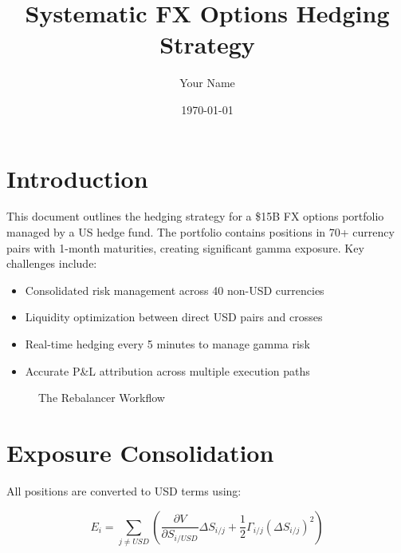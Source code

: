 \documentclass{article}
\title{Systematic FX Options Hedging Strategy}
\author{Your Name}
\date{\today}
\begin{document}
\maketitle

\section{Introduction}
This document outlines the hedging strategy for a \$15B FX options portfolio managed by a US hedge fund. The portfolio contains positions in 70+ currency pairs with 1-month maturities, creating significant gamma exposure. Key challenges include:

\begin{itemize}
\item Consolidated risk management across 40 non-USD currencies
\item Liquidity optimization between direct USD pairs and crosses
\item Real-time hedging every 5 minutes to manage gamma risk
\item Accurate P\&L attribution across multiple execution paths
\end{itemize}

\begin{figure}[ht]
\centering
{}
\caption{The Rebalancer Workflow}
\end{figure}

\section{Exposure Consolidation}
All positions are converted to USD terms using:

\begin{equation}
E_i = \sum_{j \neq USD} \left(\frac{\partial V}{\partial S_{i/USD}} \Delta S_{i/j} + \frac{1}{2}\Gamma_{i/j} (\Delta S_{i/j})^2\right)
\end{equation}
\end{document}
